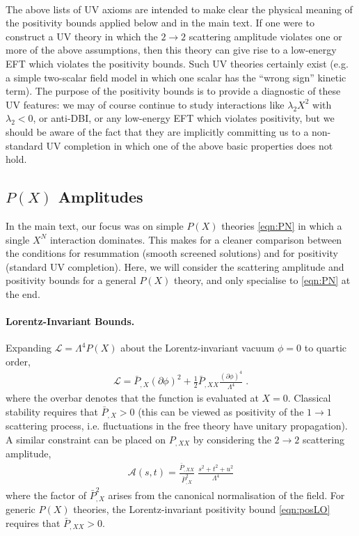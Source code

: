 \documentclass[11pt]{article}
\begin{document}
~\\
The above lists of UV axioms are intended to make clear the physical meaning of the positivity bounds applied below and in the main text. 
If one were to construct a UV theory in which the $2 \to 2$ scattering amplitude violates one or more of the above assumptions, then this theory can give rise to a low-energy EFT which violates the positivity bounds. 
Such UV theories certainly exist (e.g. a simple two-scalar field model in which one scalar has the ``wrong sign'' kinetic term). 
The purpose of the positivity bounds is to provide a diagnostic of these UV features: we may of course continue to study interactions like $\lambda_2 X^2$ with $\lambda_2 < 0$, or anti-DBI, or any low-energy EFT which violates positivity, but we should be aware of the fact that they are implicitly committing us to a non-standard UV completion in which one of the above basic properties does not hold. 



\subsection{$P(X)$ Amplitudes}
\label{app:pos_PX}

In the main text, our focus was on simple $P(X)$ theories \eqref{eqn:PN} in which a single $X^N$ interaction dominates. This makes for a cleaner comparison between the conditions for resummation (smooth screened solutions) and for positivity (standard UV completion). 
Here, we will consider the scattering amplitude and positivity bounds for a general $P(X)$ theory, and only specialise to \eqref{eqn:PN} at the end. 

\paragraph{Lorentz-Invariant Bounds.}
Expanding $\mathcal{L} = \Lambda^4 P(X)$ about the Lorentz-invariant vacuum $\phi = 0$ to quartic order,
\begin{align}
 \mathcal{L} = \bar{P}_{,X} ( \partial \phi )^2 + \frac{1}{2} \bar{P}_{,XX} \frac{ ( \partial \phi )^4}{\Lambda^4} \; .
\end{align}
where the overbar denotes that the function is evaluated at $X=0$. 
Classical stability requires that $\bar{P}_{,X} > 0$ (this can be viewed as positivity of the $1\to 1$ scattering process, i.e. fluctuations in the free theory have unitary propagation). 
A similar constraint can be placed on $P_{,XX}$ by considering the $2\to 2$ scattering amplitude,
\begin{align}
\mathcal{A} (s,t) = \frac{ \bar{P}_{,XX} }{ \bar{P}_{,X}^2} \;  \frac{s^2 + t^2 + u^2 }{ \Lambda^4 }
\end{align} 
where the factor of $\bar{P}_{,X}^2$ arises from the canonical normalisation of the field. 
For generic $P(X)$ theories, the Lorentz-invariant positivity bound \eqref{eqn:posLO} requires that $\bar{P}_{,XX} > 0$. 
\end{document}
